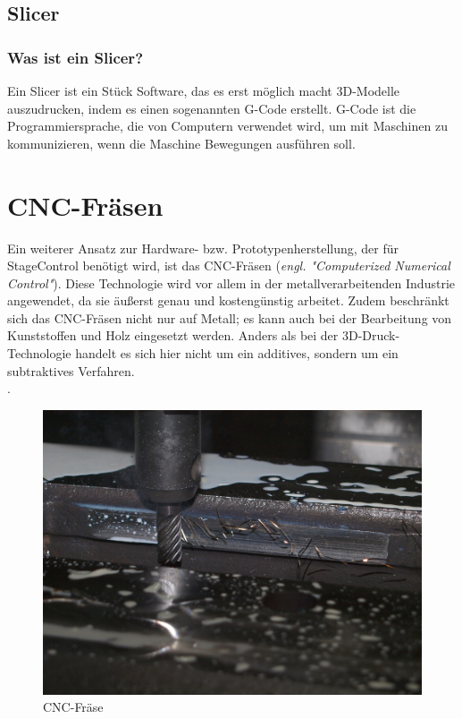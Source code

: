 \subsection{Slicer}
\subsubsection{Was ist ein Slicer?}
Ein Slicer ist ein Stück Software, das es erst möglich macht 3D-Modelle auszudrucken, indem es einen sogenannten G-Code erstellt. G-Code ist die Programmiersprache, die von Computern verwendet wird, um mit Maschinen zu kommunizieren, wenn die Maschine Bewegungen ausführen soll. \\
\textcite{SlicerGCode}


\section{CNC-Fräsen}

Ein weiterer Ansatz zur Hardware- bzw. Prototypenherstellung, der für StageControl benötigt wird, ist das CNC-Fräsen (\emph{engl. "Computerized Numerical Control"}). Diese Technologie wird vor allem in der metallverarbeitenden Industrie angewendet, da sie äußerst genau und kostengünstig arbeitet. Zudem beschränkt sich das CNC-Fräsen nicht nur auf Metall; es kann auch bei der Bearbeitung von Kunststoffen und Holz eingesetzt werden. Anders als bei der 3D-Druck-Technologie handelt es sich hier nicht um ein additives, sondern um ein subtraktives Verfahren.\\ \textcite{CNCFraesen} \textcite{CNCFraesen2} \textcite{CNCFraesen3}.


\begin{figure}[H]
	\centering
	\includegraphics[width=0.8\linewidth]{images/CNC.jpg}
	\caption[CNC-Fräse]{CNC-Fräse}
	\label{fig:cnc-fraese}
\end{figure}

